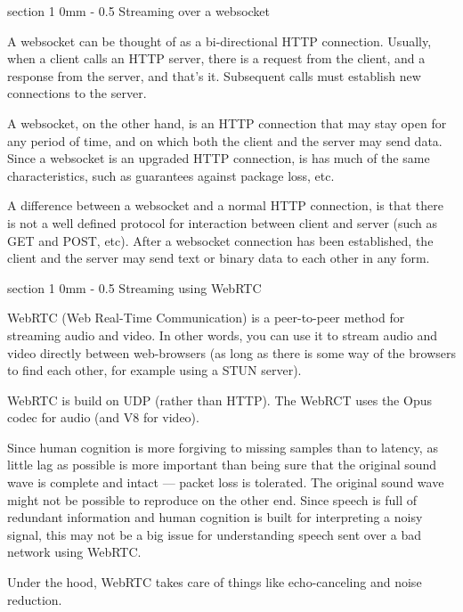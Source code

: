 \documentclass[11pt, a4paper, twoside]{article}
\makeatletter
\renewcommand{\section}{\@startsection
  {section}%
  {1}%
  {0mm}%
  {-\baselineskip}%
  {0.5\baselineskip}%
  {\bfseries\sffamily\Large}}%
\makeatother
\begin{document}
\section{Streaming over a websocket}

A websocket can be thought of as a bi-directional HTTP
connection. Usually, when a client calls an HTTP server, there is a
request from the client, and a response from the server, and that's
it. Subsequent calls must establish new connections to the server.

A websocket, on the other hand, is an HTTP connection that may stay
open for any period of time, and on which both the client and the
server may send data. Since a websocket is an upgraded HTTP
connection, is has much of the same characteristics, such as
guarantees against package loss, etc.

A difference between a websocket and a normal HTTP connection, is that
there is not a well defined protocol for interaction between client
and server (such as GET and POST, etc). After a websocket connection
has been established, the client and the server may send text or
binary data to each other in any form.


\section{Streaming using WebRTC}

WebRTC (Web Real-Time Communication) \cite{webrtc} is a peer-to-peer method for
streaming audio and video. In other words, you can use it to stream
audio and video directly between web-browsers (as long as there is
some way of the browsers to find each other, for example using a STUN
server).

WebRTC is build on UDP (rather than HTTP). The WebRCT uses the Opus
codec for audio (and V8 for video).

Since human cognition is more forgiving to missing samples than to
latency, as little lag as possible is more important than being sure
that the original sound wave is complete and intact --- packet loss is
tolerated. The original sound wave might not be possible to reproduce
on the other end. Since speech is full of redundant information and
human cognition is built for interpreting a noisy signal, this may not
be a big issue for understanding speech sent over a bad network using
WebRTC.

Under the hood, WebRTC takes care of things like echo-canceling and
noise reduction. 
\end{document}
